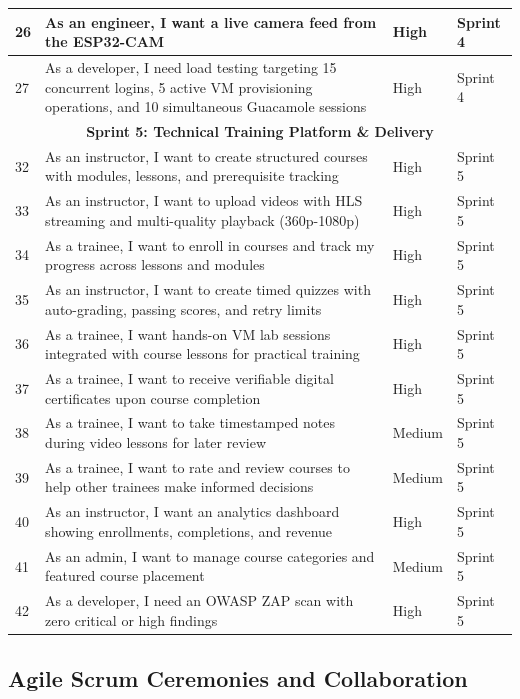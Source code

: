 \begin{longtable}{|p{}|p{}|p{}|p{}|}
26 & As an engineer, I want a live camera feed from the ESP32-CAM & High & Sprint 4 \\ \hline
27 & As a developer, I need load testing targeting 15 concurrent logins, 5 active VM provisioning operations, and 10 simultaneous Guacamole sessions & High & Sprint 4 \\ \hline
\multicolumn{4}{|c|}{\textbf{Sprint 5: Technical Training Platform \& Delivery}} \\ \hline
32 & As an instructor, I want to create structured courses with modules, lessons, and prerequisite tracking & High & Sprint 5 \\ \hline
33 & As an instructor, I want to upload videos with HLS streaming and multi-quality playback (360p-1080p) {\footnotesize\cite{hls-rfc8216}} & High & Sprint 5 \\ \hline
34 & As a trainee, I want to enroll in courses and track my progress across lessons and modules & High & Sprint 5 \\ \hline
35 & As an instructor, I want to create timed quizzes with auto-grading, passing scores, and retry limits & High & Sprint 5 \\ \hline
36 & As a trainee, I want hands-on VM lab sessions integrated with course lessons for practical training & High & Sprint 5 \\ \hline
37 & As a trainee, I want to receive verifiable digital certificates upon course completion & High & Sprint 5 \\ \hline
38 & As a trainee, I want to take timestamped notes during video lessons for later review & Medium & Sprint 5 \\ \hline
39 & As a trainee, I want to rate and review courses to help other trainees make informed decisions & Medium & Sprint 5 \\ \hline
40 & As an instructor, I want an analytics dashboard showing enrollments, completions, and revenue & High & Sprint 5 \\ \hline
41 & As an admin, I want to manage course categories and featured course placement & Medium & Sprint 5 \\ \hline
42 & As a developer, I need an OWASP ZAP scan with zero critical or high findings {\footnotesize\cite{owasp-zap-docs}} & High & Sprint 5 \\ \hline
\end{longtable}
\newpage

\subsection{Agile Scrum Ceremonies and Collaboration}

